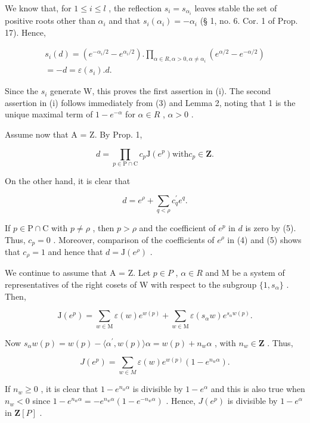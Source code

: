 We know that, for \(1 \leqslant i \leqslant l\) , the reflection \(s_i = s_{\alpha_i}\) leaves stable the set of positive roots other than \(\alpha_i\) and that \(s_i(\alpha_i) = -\alpha_i\) (§ 1, no. 6. Cor. 1 of Prop. 17). Hence,

\[
\begin{array}{l} s _ {i} (d) = (e ^ {- \alpha_ {i} / 2} - e ^ {\alpha_ {i} / 2}). \prod_ {\alpha \in R, \alpha > 0, \alpha \neq \alpha_ {i}} (e ^ {\alpha / 2} - e ^ {- \alpha / 2}) \\ = - d = \varepsilon (s _ {i}). d. \end{array}
\]

Since the \(s_{i}\) generate W, this proves the first assertion in (i). The second assertion in (i) follows immediately from (3) and Lemma 2, noting that 1 is the unique maximal term of \(1 - e^{-\alpha}\) for \(\alpha \in R\) , \(\alpha > 0\) .

Assume now that A = Z. By Prop. 1,

\[
d = \prod_ {p \in \mathrm{P} \cap \mathrm{C}} c _ {p} \mathrm{J} (e ^ {p}) \text {with} c _ {p} \in \mathbf {Z}.\tag{4}
\]

On the other hand, it is clear that

\[
d = e ^ {\rho} + \sum_ {q <   \rho} c _ {q} ^ {\prime} e ^ {q}.\tag{5}
\]

If \(p \in \mathrm{P} \cap \mathrm{C}\) with \(p \neq \rho\) , then \(p > \rho\) and the coefficient of \(e^p\) in \(d\) is zero by (5). Thus, \(c_p = 0\) . Moreover, comparison of the coefficients of \(e^\rho\) in (4) and (5) shows that \(c_\rho = 1\) and hence that \(d = \mathrm{J}(e^\rho)\) .

We continue to assume that A = Z. Let \(p \in P\) , \(\alpha \in R\) and M be a system of representatives of the right cosets of W with respect to the subgroup \(\{1, s_{\alpha}\}\) . Then,

\[
\mathrm{J} (e ^ {p}) = \sum_ {w \in \mathrm{M}} \varepsilon (w) e ^ {w (p)} + \sum_ {w \in \mathrm{M}} \varepsilon (s _ {\alpha} w) e ^ {s _ {\alpha} w (p)}.
\]

Now \(s_{\alpha}w(p) = w(p) - \langle \alpha^{\prime},w(p)\rangle \alpha = w(p) + n_w\alpha\) , with \(n_w\in \mathbf{Z}\) . Thus,

\[
J (e ^ {p}) = \sum_ {w \in M} \varepsilon (w) e ^ {w (p)} \left(1 - e ^ {n _ {w} \alpha}\right).
\]

If \(n_w \geqslant 0\) , it is clear that \(1 - e^{n_w\alpha}\) is divisible by \(1 - e^\alpha\) and this is also true when \(n_w < 0\) since \(1 - e^{n_w\alpha} = -e^{n_w\alpha}(1 - e^{-n_w\alpha})\) . Hence, \(J(e^p)\) is divisible by \(1 - e^\alpha\) in \(\mathbf{Z}[P]\) .

